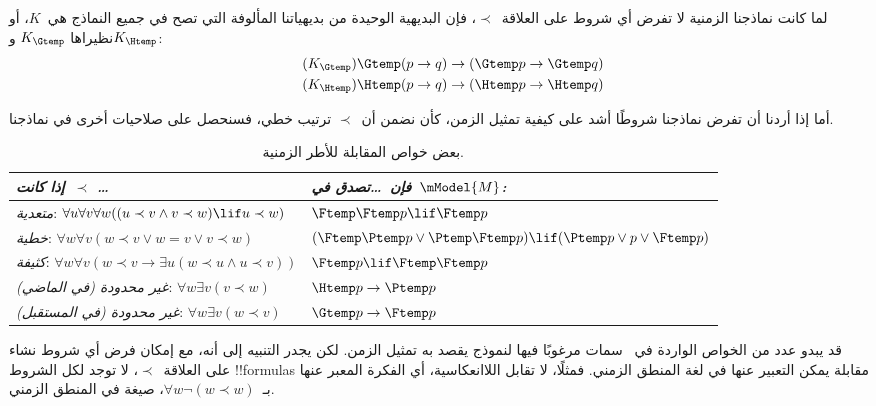 \documentclass[../../../include/open-logic-section]{subfiles}
\begin{document}


لما كانت نماذجنا الزمنية لا تفرض أي شروط على العلاقة~$\prec$، فإن البديهية
الوحيدة من بديهياتنا المألوفة التي تصح في جميع النماذج هي~$K$، أو نظيراها
$K_{\Gtemp}$ و$K_{\Htemp}$:
\begin{align*}
\tag{$K_{\Gtemp}$}  \Gtemp (p \to q) & \to (\Gtemp p \to \Gtemp q)\\
\tag{$K_{\Htemp}$}  \Htemp (p \to q) & \to (\Htemp p \to \Htemp q)
\end{align*}

أما إذا أردنا أن تفرض نماذجنا شروطًا أشد على كيفية تمثيل الزمن، كأن نضمن
أن~$\prec$ ترتيب خطي، فسنحصل على صلاحيات أخرى في نماذجنا.

\begin{table}[t]
  \begin{tabular}{| p{} || p{} |}
    \hline
    {\emph{إذا كانت~$\prec$ \dots}} & {\emph{فإن~\dots تصدق في~$\mModel{M}$:}} \\
    \hline \hline
    \emph{متعدية}: \newline
    $\forall u \forall v \forall w ((u \prec v \land v \prec w) \lif u \prec w)$ &
    $\Ftemp \Ftemp p \lif \Ftemp p$  \\
    \hline
    \emph{خطية}: \newline
    $\forall w \forall v (w \prec v \lor w = v \lor v \prec w)$ &
    $(\Ftemp \Ptemp p \lor \Ptemp \Ftemp p) \lif (\Ptemp p \lor p \lor \Ftemp p)$\\
    \hline
    \emph{كثيفة}: \newline
    $\forall w \forall v (w \prec v \to \exists u(w \prec u \land u \prec v))$ &
    $\Ftemp p \lif \Ftemp \Ftemp p$ \\
    \hline
    \emph{غير محدودة (في الماضي)}: \newline
    $\forall w \exists v( v \prec w)$ &
    $\Htemp p \to \Ptemp p$ \\
    \hline
    \emph{غير محدودة (في المستقبل)}: \newline
    $\forall w \exists v( w \prec v)$ &
    $\Gtemp p \to \Ftemp p$ \\
    \hline
  \end{tabular}
  \caption{بعض خواص المقابلة للأطر الزمنية.}
\end{table}

قد يبدو عدد من الخواص الواردة في~ سمات مرغوبًا
فيها لنموذج يقصد به تمثيل الزمن. لكن يجدر التنبيه إلى أنه، مع إمكان فرض أي
شروط نشاء على العلاقة~$\prec$، لا توجد لكل الشروط !!{formula}s مقابلة
يمكن التعبير عنها في لغة المنطق الزمني. فمثلًا، لا تقابل اللاانعكاسية، أي الفكرة المعبر
عنها بـ~$\forall w \lnot (w \prec w)$، صيغة في المنطق الزمني.
\end{document}
